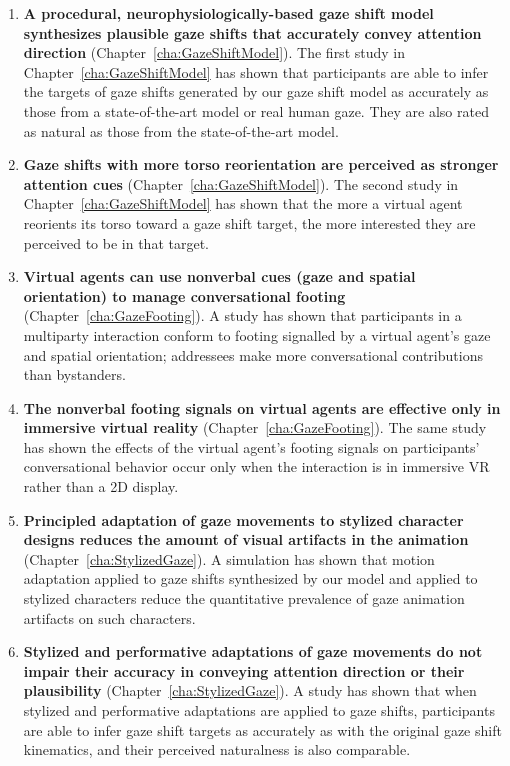 \begin{enumerate}
\item \textbf{A procedural, neurophysiologically-based gaze shift model synthesizes plausible gaze shifts that accurately convey attention direction} (Chapter~\ref{cha:GazeShiftModel}). The first study in Chapter~\ref{cha:GazeShiftModel} has shown that participants are able to infer the targets of gaze shifts generated by our gaze shift model as accurately as those from a state-of-the-art model or real human gaze. They are also rated as natural as those from the state-of-the-art model.
\item \textbf{Gaze shifts with more torso reorientation are perceived as stronger attention cues} (Chapter~\ref{cha:GazeShiftModel}). The second study in Chapter~\ref{cha:GazeShiftModel} has shown that the more a virtual agent reorients its torso toward a gaze shift target, the more interested they are perceived to be in that target.
\item \textbf{Virtual agents can use nonverbal cues (gaze and spatial orientation) to manage conversational footing} (Chapter~\ref{cha:GazeFooting}). A study has shown that participants in a multiparty interaction conform to footing signalled by a virtual agent's gaze and spatial orientation; addressees make more conversational contributions than bystanders.
\item \textbf{The nonverbal footing signals on virtual agents are effective only in immersive virtual reality} (Chapter~\ref{cha:GazeFooting}). The same study has shown the effects of the virtual agent's footing signals on participants' conversational behavior occur only when the interaction is in immersive VR rather than a 2D display.
\item \textbf{Principled adaptation of gaze movements to stylized character designs reduces the amount of visual artifacts in the animation} (Chapter~\ref{cha:StylizedGaze}). A simulation has shown that motion adaptation  applied to gaze shifts synthesized by our model and applied to stylized characters reduce the quantitative prevalence of gaze animation artifacts on such characters.
\item \textbf{Stylized and performative adaptations of gaze movements do not impair their accuracy in conveying attention direction or their plausibility} (Chapter~\ref{cha:StylizedGaze}). A study has shown that when stylized and performative adaptations are applied to gaze shifts, participants are able to infer gaze shift targets as accurately as with the original gaze shift kinematics, and their perceived naturalness is also comparable.

\end{enumerate}
